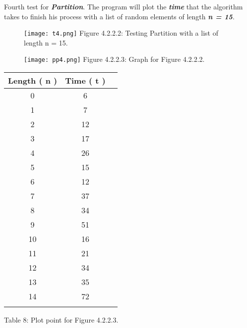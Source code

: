 \pagebreak

Fourth test for {\bfseries\itshape Partition}. The program will plot the {\bfseries\itshape time} that the algorithm takes to finish his process with a list of random elements of length {\bfseries\itshape n = 15}. \hfill \break

\begin{figure}[H]
\texttt{[image: t4.png]}
\centering \linebreak \linebreak Figure 4.2.2.2: Testing Partition with a list of length n = 15.
\end{figure} \hfill 

\begin{multicols}{2}
\begin{figure}[H]
\texttt{[image: pp4.png]}
\centering \linebreak \linebreak Figure 4.2.2.3: Graph for Figure 4.2.2.2.
\end{figure} \hfill

\begin{center}
\begin{tabular}[.5cm]{ c c c }
\toprule
Length ( n ) & Time ( t ) \\
\midrule
0 & 6 \\
\cmidrule {1-2}
1 & 7 \\
\cmidrule {1-2}
2 & 12 \\
\cmidrule {1-2}
3 & 17 \\
\cmidrule {1-2}
4 & 26 \\
\cmidrule {1-2}
5 & 15 \\
\cmidrule {1-2}
6 & 12 \\
\cmidrule {1-2}
7 & 37 \\
\cmidrule {1-2}
8 & 34 \\
\cmidrule {1-2}
9 & 51 \\
\cmidrule {1-2}
10 & 16 \\
\cmidrule {1-2}
11 & 21 \\
\cmidrule {1-2}
12 & 34 \\
\cmidrule {1-2}
13 & 35 \\
\cmidrule {1-2}
14 & 72 \\
\bottomrule
\linebreak
\end{tabular}
\linebreak \linebreak Table 8: Plot point for Figure 4.2.2.3.
\end{center}
\end{multicols} \hfill \break 

{\bfseries\itshape\color{armygreen}{Observation:}} {\itshape{}} \hfill \break

{\bfseries\itshape\color{armygreen}{Observation:}} {\itshape{}} \hfill \break

\pagebreak